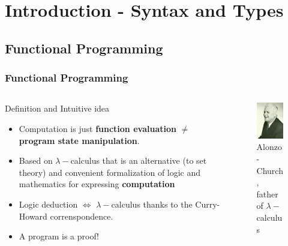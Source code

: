 \section{Introduction - Syntax and Types} 
\frame{\sectionpage}



\subsection{Functional Programming}

\begin{frame}\frametitle{Functional Programming} 
		
		\begin{columns}[T] %
			\begin{column}{.72\textwidth}
				\begin{block}{Definition and Intuitive idea}
				\begin{itemize}
					  \item Computation is just \textbf{function evaluation} $\neq$ \textbf{program
					  state manipulation}.
					  \item Based on $\lambda-$calculus that is an alternative (to set theory)
					  and convenient formalization of logic and mathematics for expressing
					  \textbf{computation}
					  \item Logic deduction $\Leftrightarrow$ $\lambda-$calculus thanks to the
					  Curry-Howard correnspondence.
					  \item A program is a proof!
				\end{itemize}
				\end{block}

			\end{column}%
				\hfill%
				\begin{column}{.28\textwidth}
				\begin{figure}
					\centering
					\includegraphics[scale=0.5]{images/Alonzo_Church.jpg}
					\caption{Alonzo-Church, father of $\lambda-$calculus}
				\end{figure}
			\end{column}%
		\end{columns}
	\end{frame}

